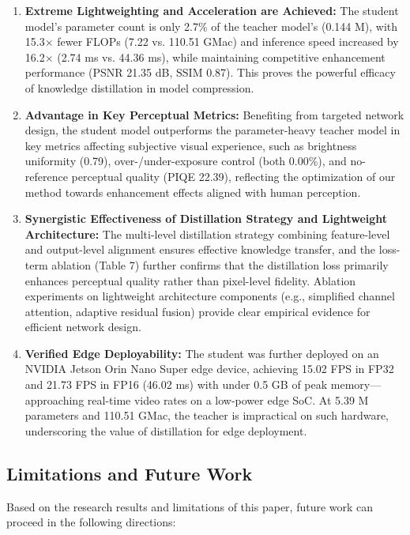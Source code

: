 \documentclass[sensors,article,submit,moreauthors]{Definitions/mdpi}
\begin{document}
\begin{enumerate}
\item \textbf{Extreme Lightweighting and Acceleration are Achieved:} The student model's parameter count is only 2.7\% of the teacher model's (0.144 M), with 15.3$\times$ fewer FLOPs (7.22 vs. 110.51 GMac) and inference speed increased by 16.2$\times$ (2.74 ms vs. 44.36 ms), while maintaining competitive enhancement performance (PSNR 21.35 dB, SSIM 0.87). This proves the powerful efficacy of knowledge distillation in model compression.
\item \textbf{Advantage in Key Perceptual Metrics:} Benefiting from targeted network design, the student model outperforms the parameter-heavy teacher model in key metrics affecting subjective visual experience, such as brightness uniformity (0.79), over-/under-exposure control (both 0.00\%), and no-reference perceptual quality (PIQE 22.39), reflecting the optimization of our method towards enhancement effects aligned with human perception.
\item \textbf{Synergistic Effectiveness of Distillation Strategy and Lightweight Architecture:} The multi-level distillation strategy combining feature-level and output-level alignment ensures effective knowledge transfer, and the loss-term ablation (Table 7) further confirms that the distillation loss primarily enhances perceptual quality rather than pixel-level fidelity. Ablation experiments on lightweight architecture components (e.g., simplified channel attention, adaptive residual fusion) provide clear empirical evidence for efficient network design.
\item \textbf{Verified Edge Deployability:} The student was further deployed on an NVIDIA Jetson Orin Nano Super edge device, achieving 15.02 FPS in FP32 and 21.73 FPS in FP16 (46.02 ms) with under 0.5 GB of peak memory---approaching real-time video rates on a low-power edge SoC. At 5.39 M parameters and 110.51 GMac, the teacher is impractical on such hardware, underscoring the value of distillation for edge deployment.
\end{enumerate}

\subsection{Limitations and Future Work}

Based on the research results and limitations of this paper, future work can proceed in the following directions:
\end{document}
